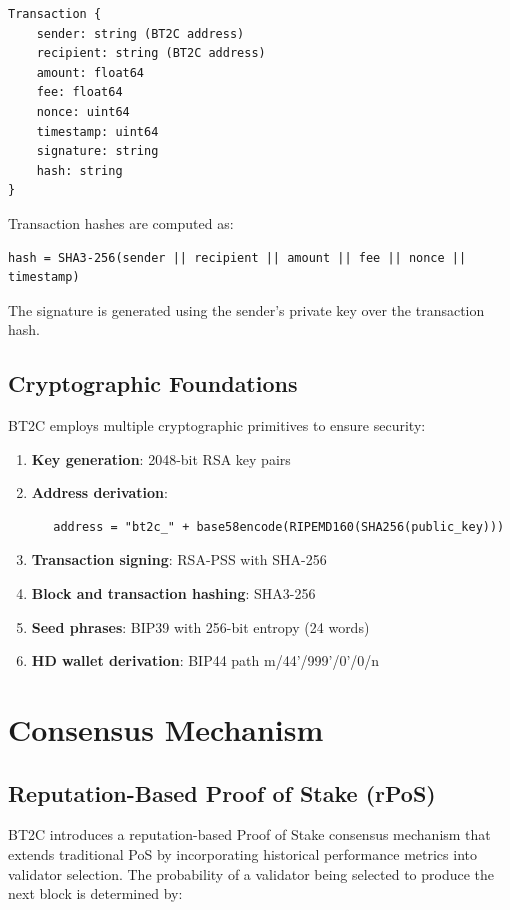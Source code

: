 \documentclass[10pt,a4paper]{article}
\begin{document}
\begin{verbatim}
Transaction {
    sender: string (BT2C address)
    recipient: string (BT2C address)
    amount: float64
    fee: float64
    nonce: uint64
    timestamp: uint64
    signature: string
    hash: string
}
\end{verbatim}

Transaction hashes are computed as:
\begin{verbatim}
hash = SHA3-256(sender || recipient || amount || fee || nonce || timestamp)
\end{verbatim}

The signature is generated using the sender's private key over the transaction hash.

\subsection{Cryptographic Foundations}
BT2C employs multiple cryptographic primitives to ensure security:

\begin{enumerate}
\item \textbf{Key generation}: 2048-bit RSA key pairs
\item \textbf{Address derivation}: 
   \begin{verbatim}
   address = "bt2c_" + base58encode(RIPEMD160(SHA256(public_key)))
   \end{verbatim}
\item \textbf{Transaction signing}: RSA-PSS with SHA-256
\item \textbf{Block and transaction hashing}: SHA3-256
\item \textbf{Seed phrases}: BIP39 with 256-bit entropy (24 words)
\item \textbf{HD wallet derivation}: BIP44 path m/44'/999'/0'/0/n
\end{enumerate}

\section{Consensus Mechanism}

\subsection{Reputation-Based Proof of Stake (rPoS)}
BT2C introduces a reputation-based Proof of Stake consensus mechanism that extends traditional PoS by incorporating historical performance metrics into validator selection. The probability of a validator being selected to produce the next block is determined by:
\end{document}
